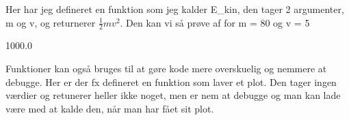 \documentclass[letterpaper,10pt,english]{jupyterBook}
\begin{document}
Her har jeg defineret en funktion som jeg kalder E\_kin, den tager 2 argumenter, m og v, og returnerer \( \frac{1}{2}  m v^2\). Den kan vi så prøve af for m = 80 og v = 5

\begin{sphinxVerbatim}[commandchars=\\\{\}]
\end{sphinxVerbatim}

\begin{sphinxVerbatim}[commandchars=\\\{\}]
1000.0
\end{sphinxVerbatim}

Funktioner kan også bruges til at gøre kode mere overskuelig og nemmere at debugge. Her er der fx defineret en funktion som laver et plot. Den tager ingen værdier og retunerer heller ikke noget, men er nem at debugge og man kan lade være med at kalde den, når man har fået sit plot.

\begin{sphinxVerbatim}[commandchars=\\\{\}]
   

  
  

 
       
       

\end{sphinxVerbatim}
\end{document}
